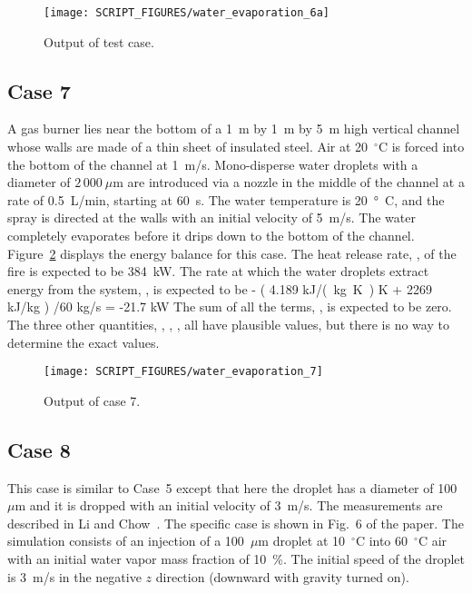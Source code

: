 \documentclass[11pt]{book}
\begin{document}
\begin{figure}[h!]
    \centering
    \texttt{[image: SCRIPT\_FIGURES/water\_evaporation\_6a]}
    \caption[Sample case ]{Output of  test case.}
    \label{water_evaporation_6a_plot}
\end{figure}

\FloatBarrier

\subsection{Case 7}
\label{water_evaporation_7}

A gas burner lies near the bottom of a 1~m by 1~m by 5~m high vertical channel whose walls are made of a thin sheet of insulated steel. Air at 20~$^\circ$C is forced into the bottom of the channel at 1~m/s. Mono-disperse water droplets with a diameter of $2\,000~\mu$m are introduced via a nozzle in the middle of the channel at a rate of 0.5~L/min, starting at 60~s. The water temperature is 20~\si{\degree C}, and the spray is directed at the walls with an initial velocity of 5~m/s. The water completely evaporates before it drips down to the bottom of the channel. Figure~\ref{water_evaporation_7_plot} displays the energy balance for this case. The heat release rate, , of the fire is expected to be 384~kW. The rate at which the water droplets extract energy from the system, , is expected to be
\be - \left( 4.189 \; \hbox{\si{kJ/(kg.K)}}  \; \hbox{K} + 2269 \; \hbox{kJ/kg} \right) /60 \; \hbox{kg/s} = -21.7 \; \hbox{kW} \ee
The sum of all the terms, , is expected to be zero. The three other quantities, , , , all have plausible values, but there is no way to determine the exact values.

\begin{figure}[h!]
\centering
\texttt{[image: SCRIPT\_FIGURES/water\_evaporation\_7]}
\caption[Sample case ]{Output of  case 7.}
\label{water_evaporation_7_plot}
\end{figure}

\FloatBarrier

\subsection{Case 8}
\label{water_evaporation_8}

This case is similar to Case~5 except that here the droplet has a diameter of 100~$\mu$m and it is dropped with an initial velocity of 3~m/s. The measurements are described in Li and Chow~\cite{LiChow:2008}. The specific case is shown in Fig.~6 of the paper. The simulation consists of an injection of a 100~$\mu$m droplet at 10~$^\circ$C into 60~$^\circ$C air with an initial water vapor mass fraction of 10~\%. The initial speed of the droplet is 3~m/s in the negative $z$ direction (downward with gravity turned on).
\end{document}
